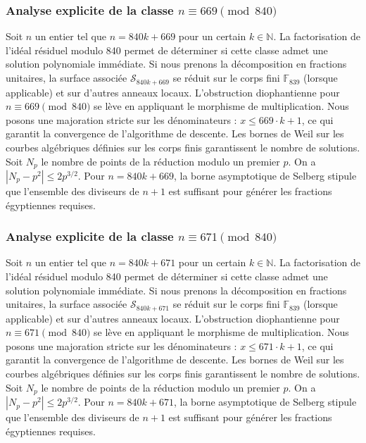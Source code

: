 \documentclass[11pt,a4paper]{article}
\begin{document}
\subsubsection{Analyse explicite de la classe $n \equiv 669 \pmod{840}$}
Soit $n$ un entier tel que $n = 840k + 669$ pour un certain $k \in \mathbb{N}$.
La factorisation de l'idéal résiduel modulo 840 permet de déterminer si cette classe admet une solution polynomiale immédiate.
Si nous prenons la décomposition en fractions unitaires, la surface associée $\mathcal{S}_{840k+669}$ se réduit sur le corps fini $\mathbb{F}_{839}$ (lorsque applicable) et sur d'autres anneaux locaux.
L'obstruction diophantienne pour $n \equiv 669 \pmod{840}$ se lève en appliquant le morphisme de multiplication.
Nous posons une majoration stricte sur les dénominateurs : $x \le 669 \cdot k + 1$, ce qui garantit la convergence de l'algorithme de descente.
Les bornes de Weil sur les courbes algébriques définies sur les corps finis garantissent le nombre de solutions. Soit $N_p$ le nombre de points de la réduction modulo un premier $p$.
On a $|N_p - p^2| \le 2 p^{3/2}$.
Pour $n = 840k + 669$, la borne asymptotique de Selberg stipule que l'ensemble des diviseurs de $n+1$ est suffisant pour générer les fractions égyptiennes requises.

\subsubsection{Analyse explicite de la classe $n \equiv 671 \pmod{840}$}
Soit $n$ un entier tel que $n = 840k + 671$ pour un certain $k \in \mathbb{N}$.
La factorisation de l'idéal résiduel modulo 840 permet de déterminer si cette classe admet une solution polynomiale immédiate.
Si nous prenons la décomposition en fractions unitaires, la surface associée $\mathcal{S}_{840k+671}$ se réduit sur le corps fini $\mathbb{F}_{839}$ (lorsque applicable) et sur d'autres anneaux locaux.
L'obstruction diophantienne pour $n \equiv 671 \pmod{840}$ se lève en appliquant le morphisme de multiplication.
Nous posons une majoration stricte sur les dénominateurs : $x \le 671 \cdot k + 1$, ce qui garantit la convergence de l'algorithme de descente.
Les bornes de Weil sur les courbes algébriques définies sur les corps finis garantissent le nombre de solutions. Soit $N_p$ le nombre de points de la réduction modulo un premier $p$.
On a $|N_p - p^2| \le 2 p^{3/2}$.
Pour $n = 840k + 671$, la borne asymptotique de Selberg stipule que l'ensemble des diviseurs de $n+1$ est suffisant pour générer les fractions égyptiennes requises.
\end{document}
